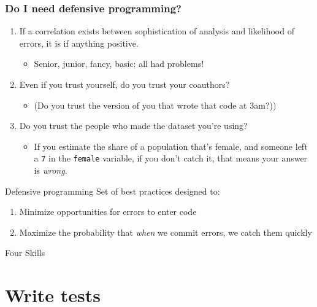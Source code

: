 \documentclass[11pt]{beamer}
\begin{document}
\begin{frame}[t]\frametitle{Do I need defensive programming?}
    \begin{enumerate}
        \pause \item If a correlation exists between sophistication of analysis and likelihood of errors, it is if anything positive.
        \begin{itemize}
            \item Senior, junior, fancy, basic: all had problems!
        \end{itemize}
        \pause \item Even if you trust yourself, do you trust your coauthors?
        \begin{itemize}
            \pause \item (Do you trust the version of you that wrote that code at 3am?))
        \end{itemize}
        \pause \item Do you trust the people who made the dataset you're using?
        \begin{itemize}
            \pause \item If you estimate the share of a population that's female, and someone left a \texttt{7} in the \texttt{female} variable, if you don't catch it, that means your answer is \emph{wrong}.
        \end{itemize}
    \end{enumerate}
\end{frame}

\begin{frame}[c]{Defensive programming}
    Set of best practices designed to:
    \begin{enumerate}
        \item Minimize opportunities for errors to enter code
        \item Maximize the probability that \emph{when} we commit errors, we catch them quickly
    \end{enumerate}
\end{frame}



\begin{frame}[c]{Four Skills}
    \tableofcontents
\end{frame}



\section{Write tests}
\end{document}
